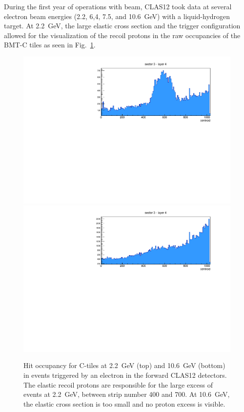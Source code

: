 During the first year of operations with beam, CLAS12 took data at several electron beam energies (2.2, 6,4, 7.5, and 10.6~GeV)
with a liquid-hydrogen target. At 2.2~GeV, the large elastic cross section and the trigger configuration allowed for the
visualization of the recoil protons in the raw occupancies of the BMT-C tiles as seen in Fig.~\ref{fig:mm-occupancy_22_10}. 

\begin{figure}[htb]
 \includegraphics[width=1.0\columnwidth]{images/occupancy2GeV}
 \includegraphics[width=1.0\columnwidth]{images/occupancy10GeV}
 \caption{Hit occupancy for C-tiles at 2.2~GeV (top) and 10.6~GeV (bottom) in events triggered by an electron in the forward
   CLAS12 detectors. The elastic recoil protons are responsible for the large excess of events at 2.2~GeV, between strip number
   400 and 700. At 10.6~GeV, the elastic cross section is too small and no proton excess is visible.}
 \label{fig:mm-occupancy_22_10}
\end{figure}

